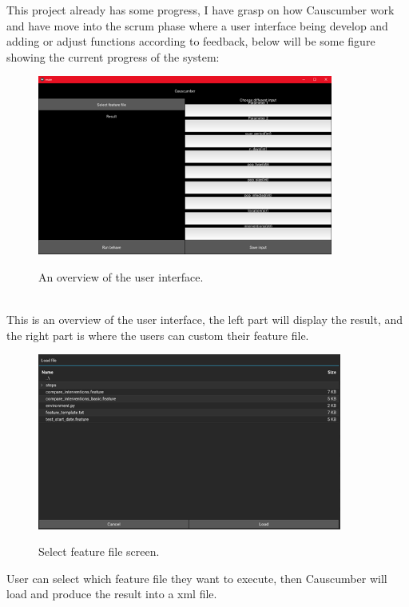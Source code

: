 This project already has some progress, I have grasp on how Causcumber work and have move into the scrum phase where a user interface being develop and adding or adjust functions according to feedback, below will be some figure showing the current progress of the system:
\begin{figure}[h]
	\centering
	\includegraphics[width=9.7cm]{figures/Gui_overview.png}\\
	\caption{An overview of the user interface.}
	\label{fig:figure4}
\end{figure}\\
This is an overview of the user interface, the left part will display the result, and the right part is where the users can custom their feature file.\clearpage
\begin{figure}[h]
	\centering
	\includegraphics[width=10cm]{figures/select_feature_file.png}\\
	\caption{Select feature file screen.}
	\label{fig:figure5}
\end{figure}
\noindent User can select which feature file they want to execute, then Causcumber will load and produce the result into a xml file.
